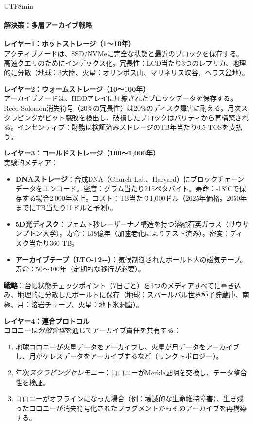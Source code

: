 \documentclass[11pt]{article}
\begin{document}
\begin{CJK}{UTF8}{min}
\paragraph{解決策：多層アーカイブ戦略}

\textbf{レイヤー1：ホットストレージ（1〜10年）}\\
アクティブノードは、SSD/NVMeに完全な状態と最近のブロックを保存する。高速クエリのためにインデックス化。冗長性：LCD当たり3つのレプリカ、地理的に分散（地球：3大陸、火星：オリンポス山、マリネリス峡谷、ヘラス盆地）。

\textbf{レイヤー2：ウォームストレージ（10〜100年）}\\
アーカイブノードは、HDDアレイに圧縮されたブロックデータを保存する。Reed-Solomon消失符号（20\%の冗長性）は20\%のディスク障害に耐える。月次スクラビングがビット腐敗を検出し、破損したブロックはパリティから再構築される。インセンティブ：財務は検証済みストレージのTB年当たり0.5 TOSを支払う。

\textbf{レイヤー3：コールドストレージ（100〜1,000年）}\\
実験的メディア：
\begin{itemize}[noitemsep]
  \item \textbf{DNAストレージ}：合成DNA（Church Lab、Harvard）にブロックチェーンデータをエンコード。密度：グラム当たり215ペタバイト。寿命：-18°Cで保存する場合2,000年以上。コスト：TB当たり1,000ドル（2025年価格。2050年までにTB当たり10ドルと予測）。
  \item \textbf{5D光ディスク}：フェムト秒レーザーナノ構造を持つ溶融石英ガラス（サウサンプトン大学）。寿命：138億年（加速老化によりテスト済み）。密度：ディスク当たり360 TB。
  \item \textbf{アーカイブテープ（LTO-12+）}：気候制御されたボールト内の磁気テープ。寿命：50〜100年（定期的な移行が必要）。
\end{itemize}
\textbf{戦略}：台帳状態チェックポイント（7日ごと）を3つのメディアすべてに書き込み、地理的に分散したボールトに保存（地球：スバールバル世界種子貯蔵庫、南極、月：溶岩チューブ、火星：地下氷洞窟）。

\textbf{レイヤー4：連合プロトコル}\\
コロニーは\emph{分散管理}を通じてアーカイブ責任を共有する：
\begin{enumerate}[noitemsep]
  \item 地球コロニーが火星データをアーカイブし、火星が月データをアーカイブし、月がケレスデータをアーカイブするなど（リングトポロジー）。
  \item 年次\emph{スクラビングセレモニー}：コロニーがMerkle証明を交換し、データ整合性を検証。
  \item コロニーがオフラインになった場合（例：壊滅的な生命維持障害）、生き残ったコロニーが消失符号化されたフラグメントからそのアーカイブを再構築する。
\end{enumerate}


\end{CJK}
\end{document}
